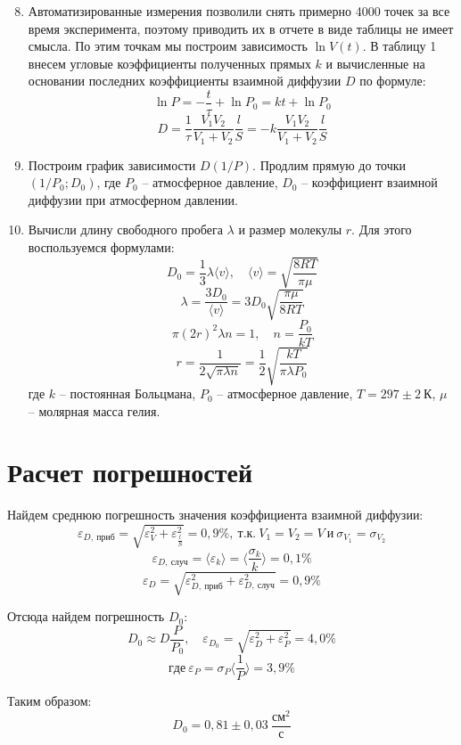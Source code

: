 \documentclass[14pt, a4paper]{report}
\begin{document}
\begin{enumerate}

\setcounter{enumi}{7}

\item Автоматизированные измерения позволили снять примерно 4000 точек за все время эксперимента, поэтому приводить их в отчете в виде таблицы не имеет смысла. По этим точкам мы построим зависимость $\ln V(t)$. В таблицу 1 внесем угловые коэффициенты полученных прямых $k$ и вычисленные на основании последних коэффициенты взаимной диффузии $D$ по формуле:
\[\ln P=-\frac{t}{\tau}+\ln P_0=kt+\ln P_0\]
\[D=\frac{1}{\tau}\frac{V_1V_2}{V_1+V_2}\frac{l}{S}=-k\frac{V_1V_2}{V_1+V_2}\frac{l}{S}\]

\item Построим график зависимости $D(1/P)$. Продлим прямую до точки $(1/P_0; D_0)$, где $P_0$ -- атмосферное давление, $D_0$ -- коэффициент взаимной диффузии при атмосферном давлении.

\item Вычисли длину свободного пробега $\lambda$ и размер молекулы $r$. Для этого воспользуемся формулами:
\[D_0=\frac{1}{3}\lambda\langle v\rangle,\quad \langle v\rangle=\sqrt{\frac{8RT}{\pi\mu}}\]
\[\lambda=\frac{3D_0}{\langle v\rangle}=3D_0\sqrt{\frac{\pi\mu}{8RT}}\]
\[\pi(2r)^2\lambda n=1,\quad n=\frac{P_0}{kT}\]
\[r=\frac{1}{2\sqrt{\pi\lambda n}}=\frac{1}{2}\sqrt{\frac{kT}{\pi\lambda P_0}}\]
где $k$ -- постоянная Больцмана, $P_0$ -- атмосферное давление, $T=297\pm2\ К$, $\mu$ -- молярная масса гелия.

\end{enumerate}

\section{Расчет погрешностей}
Найдем среднюю погрешность значения коэффициента взаимной диффузии:
\[\varepsilon_{D,\ приб}=\sqrt{\varepsilon_V^2+\varepsilon_{\frac{l}{S}}^2}=0,9\%,\ т.к.\ V_1=V_2=V\ и\  \sigma_{V_1}=\sigma_{V_2}\]
\[\varepsilon_{D,\ случ}=\langle\varepsilon_k\rangle=\langle\frac{\sigma_k}{k}\rangle=0,1\%\]
\[\varepsilon_{D}=\sqrt{\varepsilon_{D,\ приб}^2+\varepsilon_{D,\ случ}^2}=0,9\%\]

Отсюда найдем погрешность $D_0$:
\[D_0\approx D\frac{P}{P_0},\quad\varepsilon_{D_0}=\sqrt{\varepsilon_D^2+\varepsilon_P^2}=4,0\%\]
\[где\ \varepsilon_P=\sigma_P\langle\frac{1}{P}\rangle=3,9\%\]

Таким образом:
\[D_0=0,81\pm0,03\ \frac{{см}^2}{с}\]
\end{document}
